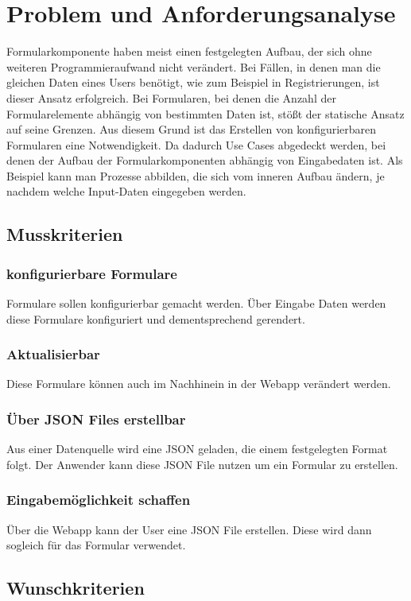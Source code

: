\documentclass[a4paper,11pt]{scrreprt}
\begin{document}
\chapter{Problem und Anforderungsanalyse}
Formularkomponente haben meist einen festgelegten Aufbau, der sich ohne weiteren Programmieraufwand nicht verändert. Bei Fällen, in denen man die gleichen Daten eines Users benötigt, wie zum Beispiel in Registrierungen, ist dieser Ansatz erfolgreich. Bei Formularen, bei denen die Anzahl der Formularelemente abhängig von bestimmten Daten ist, stößt der statische Ansatz auf seine Grenzen. Aus diesem Grund ist das Erstellen von konfigurierbaren Formularen eine Notwendigkeit. Da dadurch Use Cases abgedeckt werden, bei denen der Aufbau der Formularkomponenten abhängig von Eingabedaten ist. Als Beispiel kann man Prozesse abbilden, die sich vom inneren Aufbau ändern, je nachdem welche Input-Daten eingegeben werden.  


\section{Musskriterien}
\subsection{konfigurierbare Formulare}
Formulare sollen konfigurierbar gemacht werden. Über Eingabe Daten werden diese Formulare konfiguriert und dementsprechend gerendert.
\subsection{Aktualisierbar}
Diese Formulare können auch im Nachhinein in der Webapp verändert werden.
\subsection{Über JSON Files erstellbar}
Aus einer Datenquelle wird eine JSON geladen, die einem festgelegten Format folgt. Der Anwender kann diese JSON File nutzen um ein Formular zu erstellen. 
\subsection{Eingabemöglichkeit schaffen}
Über die Webapp kann der User eine JSON File erstellen. Diese wird dann sogleich für das Formular verwendet.

\section{Wunschkriterien}
\end{document}
